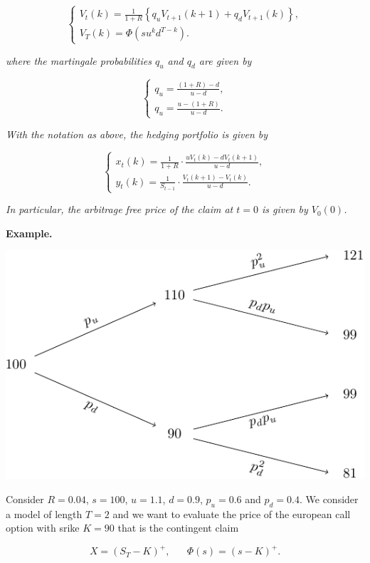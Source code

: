 \documentclass[
]{article}
\begin{document}
\[
\left\{\begin{matrix}V_t(k)=\frac{1}{1+R}\left\{q_uV_{t+1}(k+1)+q_dV_{t+1}(k)\right\},\\ V_T(k)=\Phi(su^kd^{T-k}).\end{matrix}\right.
\]

\emph{where the martingale probabilities \(q_u\) and \(q_d\) are given
by}

\[
\left\{\begin{matrix}q_u=\frac{(1+R)-d}{u-d},\\ q_u=\frac{u-(1+R)}{u-d}.\end{matrix}\right.
\]

\emph{With the notation as above, the hedging portfolio is given by}

\[
\left\{\begin{matrix}x_t(k)=\frac{1}{1+R}\cdot\frac{uV_t(k)-dV_t(k+1)}{u-d},\\ y_t(k)=\frac{1}{S_{t-1}}\cdot\frac{V_t(k+1)-V_t(k)}{u-d}.\end{matrix}\right.
\]

\emph{In particular, the arbitrage free price of the claim at \(t=0\) is
given by \(V_0(0)\).}

\textbf{Example.}

\includegraphics{theory_files/figure-latex/unnamed-chunk-2-1.pdf}

Consider \(R=0.04\), \(s=100\), \(u=1.1\), \(d=0.9\), \(p_u=0.6\) and
\(p_d=0.4\). We consider a model of length \(T=2\) and we want to
evaluate the price of the european call option with srike \(K=90\) that
is the contingent claim

\[
X=(S_T-K)^+,\hspace{20pt}\Phi(s)=(s-K)^+.
\]
\end{document}
